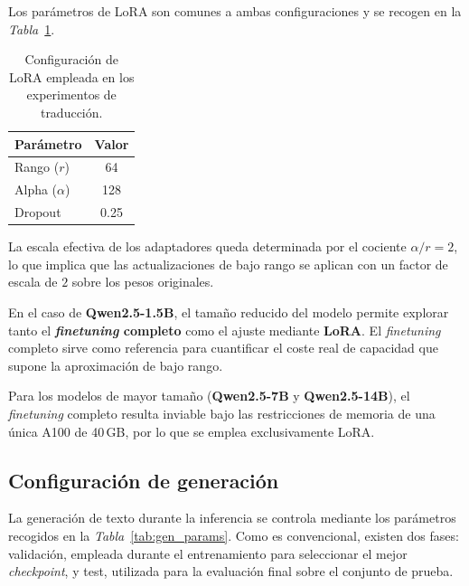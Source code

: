 Los parámetros de LoRA son comunes a ambas configuraciones y se recogen en la \textit{Tabla}~\ref{tab:lora_params}.

\begin{table}[H]
	\centering
		\begin{tabular}{lc}
			\hline
			\textbf{Parámetro} & \textbf{Valor} \\ \hline
			Rango ($r$)        & 64             \\
			Alpha ($\alpha$)   & 128            \\
			Dropout            & 0.25           \\ \hline
			\end{tabular}
			\caption{Configuración de LoRA empleada en los experimentos de traducción.}
		\label{tab:lora_params}
	\end{table}

La escala efectiva de los adaptadores queda determinada por el cociente $\alpha / r = 2$, lo que implica que las actualizaciones de bajo rango se aplican con un factor de escala de $2$ sobre los pesos originales.

En el caso de \textbf{Qwen2.5-1.5B}, el tamaño reducido del modelo permite explorar tanto el \textbf{\textit{finetuning} completo} como el ajuste mediante \textbf{LoRA}.
El \textit{finetuning} completo sirve como referencia para cuantificar el coste real de capacidad que supone la aproximación de bajo rango.

Para los modelos de mayor tamaño (\textbf{Qwen2.5-7B} y \textbf{Qwen2.5-14B}), el \textit{finetuning} completo resulta inviable bajo las restricciones de memoria de una única A100 de 40\,GB, por lo que se emplea exclusivamente LoRA.

\subsection{Configuración de generación}
La generación de texto durante la inferencia se controla mediante los parámetros recogidos en la \textit{Tabla}~\ref{tab:gen_params}.
Como es convencional, existen dos fases: validación, empleada durante el entrenamiento para seleccionar el mejor \textit{checkpoint}, y test, utilizada para la evaluación final sobre el conjunto de prueba.

